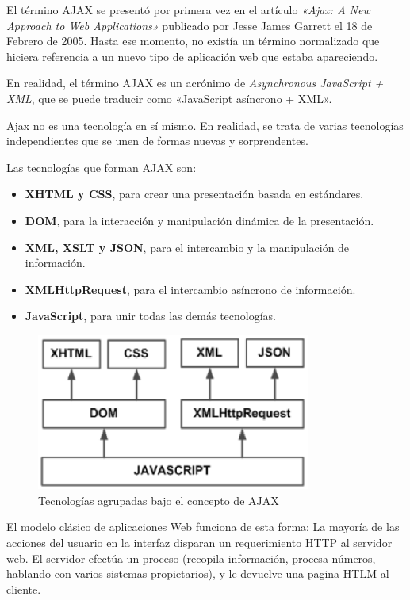     El término AJAX se presentó por primera vez en el artículo {\it «Ajax: A New Approach to Web Applications»} publicado por Jesse James Garrett el 18 de Febrero de 2005. Hasta ese momento, no existía un término normalizado que hiciera referencia a un nuevo tipo de aplicación web que estaba apareciendo.

    En realidad, el término AJAX es un acrónimo de {\it Asynchronous JavaScript + XML}, que se puede traducir como «JavaScript asíncrono + XML».
    
    Ajax no es una tecnología en sí mismo. En realidad, se trata de varias tecnologías independientes que se unen de formas nuevas y sorprendentes.
    
    Las tecnologías que forman AJAX son:
    
      \begin{itemize}
        \item {\bf XHTML y CSS}, para crear una presentación basada en estándares.
        \item {\bf DOM}, para la interacción y manipulación dinámica de la presentación.
        \item {\bf XML, XSLT y JSON}, para el intercambio y la manipulación de información.
        \item {\bf XMLHttpRequest}, para el intercambio asíncrono de información.
        \item {\bf JavaScript}, para unir todas las demás tecnologías.
      \end{itemize}
   
      \begin{figure}[H]
        \centering
          \includegraphics[width=9cm]{./eps/tecnologias/ajax_tecnologias_agrupadas.eps}
        \caption{Tecnologías agrupadas bajo el concepto de AJAX}
        \label{fig:tec_ajax_techs}
      \end{figure}
      
   El modelo clásico de aplicaciones Web funciona de esta forma: La mayoría de las acciones del usuario en la interfaz disparan un requerimiento HTTP al servidor web. El servidor efectúa un proceso (recopila información, procesa números, hablando con varios sistemas propietarios), y le devuelve una pagina HTLM al cliente.
   

